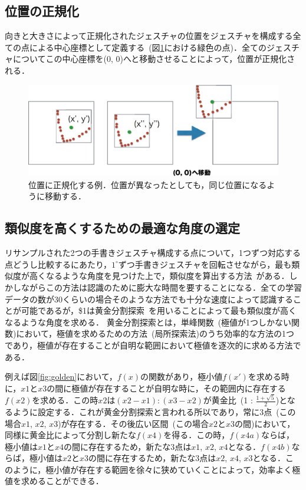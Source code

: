 \subsection{位置の正規化}
向きと大きさによって正規化されたジェスチャの位置をジェスチャを構成する全ての点による中心座標として定義する~(図\ref{fig:position}における緑色の点)．全てのジェスチャについてこの中心座標を(0, 0)へと移動させることによって，位置が正規化される．

\begin{figure} [!h]
\centering
\includegraphics [width=0.8\columnwidth]{img/position.eps}
\caption{位置に正規化する例．位置が異なったとしても，同じ位置になるように移動する．}
\label{fig:position}
\end{figure}

\subsection{類似度を高くするための最適な角度の選定}
リサンプルされた2つの手書きジェスチャ構成する点について，1つずつ対応する点どうし比較するにあたり，$1^\circ$ずつ手書きジェスチャを回転させながら，最も類似度が高くなるような角度を見つけた上で，類似度を算出する方法~\cite{Kara:2005:ITS:1652319.1652712}がある．しかしながらこの方法は認識のために膨大な時間を要することになる．全ての学習データの数が30くらいの場合そのような方法でも十分な速度によって認識することが可能であるが，\$1は黄金分割探索~\cite{Press:1992:NRC:148286}を用いることによって最も類似度が高くなるような角度を求める．
黄金分割探索とは，単峰関数~(極値が1つしかない関数)において，極値を求めるための方法~(局所探索法)のうち効率的な方法の1つであり，極値が存在することが自明な範囲において極値を逐次的に求める方法である．

例えば図\ref{fig:golden}において，$f(x)$の関数があり，極小値$f(x')$を求める時に，$x1$と$x3$の間に極値が存在することが自明な時に，その範囲内に存在する$f(x2)$を求める．この時$x2$は$(x2 - x1) : (x3 - x2)$が黄金比~(1 : $\frac{1+\sqrt{5}}{2}$)となるように設定する．これが黄金分割探索と言われる所以であり，常に3点~(この場合$x1$, $x2$, $x3$)が存在する．その後広い区間~(この場合$x2$と$x3$の間)において，同様に黄金比によって分割し新たな$f(x4)$を得る．この時，$f(x4a)$ならば，極小値は$x1$と$x4$の間に存在するため，新たな3点は$x1$, $x2$, $x4$となる．$f(x4b)$ならば，極小値は$x2$と$x3$の間に存在するため，新たな3点は$x2$, $x4$, $x3$となる．このように，極小値が存在する範囲を徐々に狭めていくことによって，効率よく極値を求めることができる．

